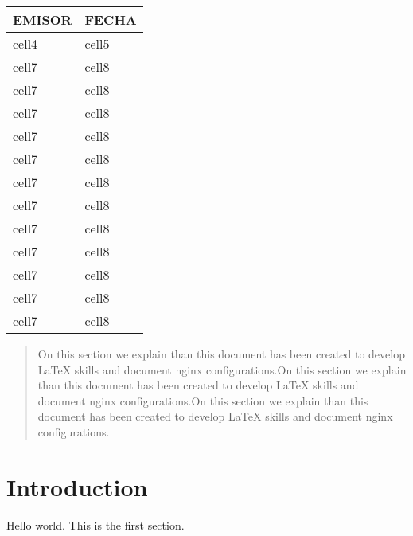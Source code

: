 \documentclass[10pt, a4paper]{article} %
\begin{document}
\begin{tabularx}{0.8\textwidth} { 
    | >{\raggedright\arraybackslash}X 
    | >{\centering\arraybackslash}X | }
    \hline
    EMISOR & FECHA \\ 
    \hline
    cell4 & cell5 \\
    \hline  
    cell7 & cell8 \\ 
    \hline 
    cell7 & cell8 \\ 
    \hline 
    cell7 & cell8 \\ 
    \hline 
    cell7 & cell8 \\ 
    \hline 
    cell7 & cell8 \\ 
    \hline 
    cell7 & cell8 \\ 
    \hline 
    cell7 & cell8 \\ 
    \hline 
    cell7 & cell8 \\ 
    \hline 
    cell7 & cell8 \\ 
    \hline 
    cell7 & cell8 \\ 
    \hline 
    cell7 & cell8 \\ 
    \hline 
    cell7 & cell8 \\ 
    \hline 
\end{tabularx}

\newpage %

\begin{abstract}
    On this section we explain than this document has been created to develop LaTeX skills and document
    nginx configurations.On this section we explain than this document has been created to develop LaTeX skills and document
    nginx configurations.On this section we explain than this document has been created to develop LaTeX skills and document
    nginx configurations.
\end{abstract}

\newpage %

\begingroup %
\color{DarkRed}%
\tableofcontents
\endgroup   %

\newpage %


\section{Introduction} %

Hello world. This is the first section.
\end{document}
